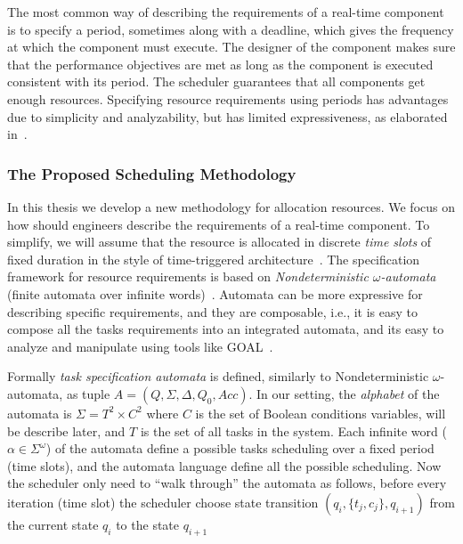 \documentclass[ twoside, 12pt ]{article}
\begin{document}
{The most common way of describing the requirements of a real-time component is to specify a period, sometimes along with a deadline, which gives the frequency at which the component must execute. 
The designer of the component makes sure that the performance objectives are met as long as the component is executed consistent with its period. The scheduler guarantees that all components get enough resources.
Specifying resource requirements using periods has advantages due to simplicity and analyzability, but has limited expressiveness, as elaborated in~\cite{RTComposer}. 





\subsubsection{The Proposed Scheduling Methodology}
In this thesis we develop a new methodology for allocation resources. We focus on how should engineers describe the requirements of a real-time component.
To simplify, we will assume that the resource is allocated in discrete \textit{time slots} of fixed duration in the style of time-triggered architecture~\cite{RTComposer}.
The specification framework for resource requirements is based on \textit{Nondeterministic $\omega$-automata} (finite automata over infinite words)~\cite{???}.
Automata can be more expressive for describing specific requirements, and they are composable, i.e., it is easy to compose all the tasks requirements into an integrated automata, and its easy to analyze and manipulate using tools like GOAL~\cite{???}.


Formally \textit{task specification automata} is defined, similarly to Nondeterministic $\omega$-automata, as tuple $A=(Q,\Sigma,\Delta,Q_0,Acc)$.
In our setting, the \textit{alphabet} of the automata is $\Sigma = T^2 \times C^2$ where 
$C$ is the set of Boolean conditions variables, will be describe later, and $T$ is the set of all tasks in the system.
Each infinite word ($\alpha \in \Sigma^\omega$) of the automata define a possible tasks scheduling over a fixed period (time slots), and the automata language define all the possible scheduling.
Now the scheduler only need to ``walk through'' the automata as follows, before every iteration (time slot) the scheduler choose state transition $(q_i , \{t_j , c_j\}, q_{i+1})$ from the current state $q_i$ to the state $q_{i+1}$


}
\end{document}
